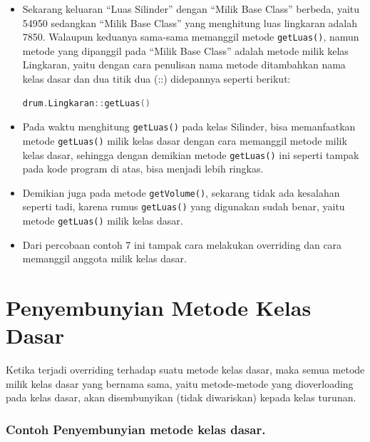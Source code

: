 \begin{itemize}
\item
  Sekarang keluaran ``Luas Silinder'' dengan ``Milik Base Class''
  berbeda, yaitu 54950 sedangkan ``Milik Base Class'' yang menghitung
  luas lingkaran adalah 7850. Walaupun keduanya sama-sama memanggil
  metode \texttt{getLuas()}, namun metode yang dipanggil pada ``Milik
  Base Class'' adalah metode milik kelas Lingkaran, yaitu dengan cara
  penulisan nama metode ditambahkan nama kelas dasar dan dua titik dua
  (::) didepannya seperti berikut:

\begin{lstlisting}[language=c++, numbers=none]
drum.Lingkaran::getLuas()
\end{lstlisting}
\item
  Pada waktu menghitung \texttt{getLuas()} pada kelas Silinder, bisa
  memanfaatkan metode \texttt{getLuas()} milik kelas dasar dengan cara
  memanggil metode milik kelas dasar, sehingga dengan demikian metode
  \texttt{getLuas()} ini seperti tampak pada kode program di atas, bisa
  menjadi lebih ringkas.
\item
  Demikian juga pada metode \texttt{getVolume()}, sekarang tidak ada
  kesalahan seperti tadi, karena rumus \texttt{getLuas()} yang digunakan
  sudah benar, yaitu metode \texttt{getLuas()} milik kelas dasar.
\item
  Dari percobaan contoh 7 ini tampak cara melakukan overriding dan cara
  memanggil anggota milik kelas dasar.
\end{itemize}

\section{Penyembunyian Metode Kelas
Dasar}\label{penyembunyian-metode-kelas-dasar}

Ketika terjadi overriding terhadap suatu metode kelas dasar, maka semua
metode milik kelas dasar yang bernama sama, yaitu metode-metode yang
dioverloading pada kelas dasar, akan disembunyikan (tidak diwariskan)
kepada kelas turunan.

\subsubsection*{Contoh Penyembunyian metode kelas dasar.}

